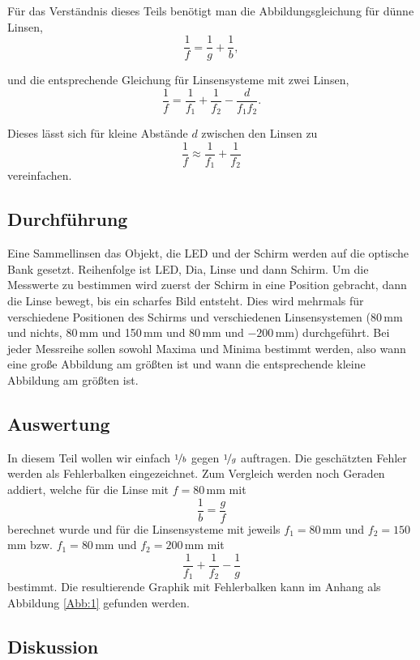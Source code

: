 \documentclass[11pt,a4paper]{article}
\begin{document}
F\"ur das Verst\"andnis dieses Teils ben\"otigt man die Abbildungsgleichung f\"ur d\"unne Linsen,
\begin{equation}
\frac{1}{f}=\frac{1}{g}+\frac{1}{b},\label{eq:1}
\end{equation}

und die entsprechende Gleichung f\"ur Linsensysteme mit zwei Linsen,
\begin{equation}
\frac{1}{f}=\frac{1}{f_1}+\frac{1}{f_2}-\frac{d}{f_1f_2}.\label{eq:2}
\end{equation}

Dieses l\"asst sich f\"ur kleine Abst\"ande $d$ zwischen den Linsen zu
\[
\frac{1}{f}\approx\frac{1}{f_1}+\frac{1}{f_2}
\]
vereinfachen.


\subsection{Durchführung}

Eine Sammellinsen das Objekt, die LED und der Schirm werden auf die optische Bank gesetzt. Reihenfolge ist LED, Dia, Linse und dann Schirm.
Um die Messwerte zu bestimmen wird zuerst der Schirm in eine Position gebracht, dann die Linse bewegt, bis ein scharfes Bild entsteht. Dies wird mehrmals f\"ur verschiedene Positionen des Schirms und verschiedenen Linsensystemen (80\,mm und nichts, 80\,mm und 150\,mm und 80\,mm und $-200$\,mm) durchgef\"uhrt. Bei jeder Messreihe sollen sowohl Maxima und Minima bestimmt werden, also wann eine gro\ss e Abbildung am gr\"o\ss ten ist und wann die entsprechende kleine Abbildung am gr\"o\ss ten ist.

\subsection{Auswertung}

In diesem Teil wollen wir einfach $\nicefrac{1}{b}$ gegen $\nicefrac{1}{g}$ auftragen. Die gesch\"atzten Fehler werden als Fehlerbalken eingezeichnet. Zum Vergleich werden noch Geraden addiert, welche f\"ur die Linse mit $f=80\,$mm mit
\[
\frac{1}{b}=\frac{g}{f}
\]
berechnet wurde und f\"ur die Linsensysteme mit jeweils $f_1=80\,$mm und $f_2=150\,$mm bzw. $f_1=80\,$mm und $f_2=200\,$mm mit
\[
\frac{1}{f_1}+\frac{1}{f_2}-\frac{1}{g}
\]
bestimmt. Die resultierende Graphik mit Fehlerbalken kann im Anhang als Abbildung \ref{Abb:1} gefunden werden.

\subsection{Diskussion}
\end{document}
